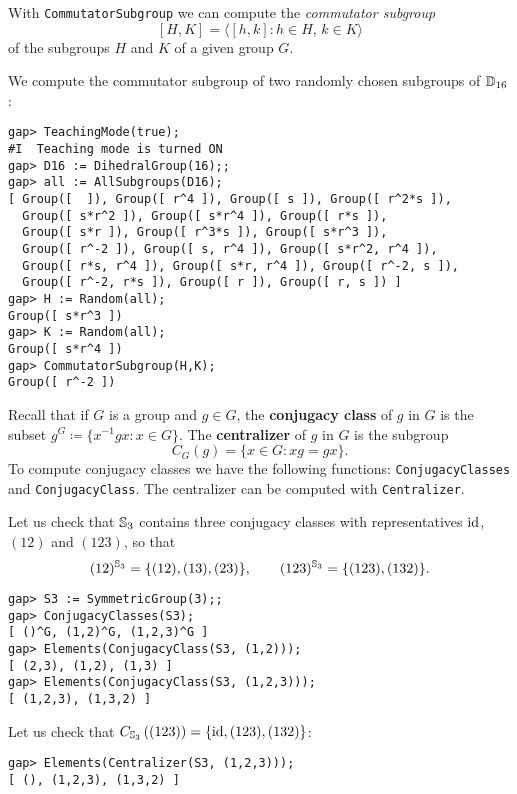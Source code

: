 With \lstinline{CommutatorSubgroup} we can compute
the \emph{commutator subgroup} 
\[
[H,K]=\langle [h,k]: h\in H,\,k\in K\rangle
\]
of the subgroups $H$ and $K$ of a given group $G$. 

\begin{example}
We compute the commutator subgroup of 
two randomly chosen subgroups of $\mathbb{D}_{16}$:
\begin{lstlisting}
gap> TeachingMode(true);
#I  Teaching mode is turned ON
gap> D16 := DihedralGroup(16);;
gap> all := AllSubgroups(D16);
[ Group([  ]), Group([ r^4 ]), Group([ s ]), Group([ r^2*s ]),
  Group([ s*r^2 ]), Group([ s*r^4 ]), Group([ r*s ]),
  Group([ s*r ]), Group([ r^3*s ]), Group([ s*r^3 ]),
  Group([ r^-2 ]), Group([ s, r^4 ]), Group([ s*r^2, r^4 ]),
  Group([ r*s, r^4 ]), Group([ s*r, r^4 ]), Group([ r^-2, s ]),
  Group([ r^-2, r*s ]), Group([ r ]), Group([ r, s ]) ]
gap> H := Random(all);
Group([ s*r^3 ])
gap> K := Random(all);
Group([ s*r^4 ])
gap> CommutatorSubgroup(H,K);
Group([ r^-2 ])
\end{lstlisting}
\end{example}

Recall that if $G$ is a group and $g\in G$, the \textbf{conjugacy class} of $g$
in $G$ is the subset $g^G\coloneqq\{x^{-1}gx:x\in G\}$. The \textbf{centralizer} of $g$ in
$G$ is the subgroup
\[
	C_G(g)=\{x\in G:xg=gx\}. 
\]
To compute conjugacy classes we have the following functions:
\lstinline{ConjugacyClasses} and \lstinline{ConjugacyClass}. The centralizer
can be computed with \lstinline{Centralizer}.  

\begin{example}
Let us check that $\mathbb{S}_3$ contains three conjugacy classes with
representatives $\operatorname{id}$, $(12)$ and $(123)$, so that 
\[(12)^{\mathbb{S}_3}=\{(12),(13),(23)\}, \qquad (123)^{\mathbb{S}_3}=\{(123),(132)\}.\]
\begin{lstlisting}
gap> S3 := SymmetricGroup(3);;
gap> ConjugacyClasses(S3);
[ ()^G, (1,2)^G, (1,2,3)^G ]
gap> Elements(ConjugacyClass(S3, (1,2)));
[ (2,3), (1,2), (1,3) ]
gap> Elements(ConjugacyClass(S3, (1,2,3)));
[ (1,2,3), (1,3,2) ]
\end{lstlisting}
Let us check that $C_{\mathbb{S}_3}\left( (123) \right)=\{\operatorname{id},(123),(132)\}$: 
\begin{lstlisting}
gap> Elements(Centralizer(S3, (1,2,3)));
[ (), (1,2,3), (1,3,2) ]
\end{lstlisting}
\end{example}

